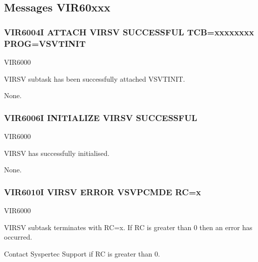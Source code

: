 \documentclass[letterpaper,10pt,english]{sphinxmanual}
\begin{document}
\subsection{Messages VIR60xxx}
\label{\detokenize{messages:messages-vir60xxx}}

\subsubsection{VIR6004I ATTACH VIRSV SUCCESSFUL TCB=xxxxxxxx PROG=VSVTINIT}
\label{\detokenize{messages:vir6004i-attach-virsv-successful-tcb-xxxxxxxx-prog-vsvtinit}}\begin{description}
\sphinxAtStartPar
VIR6000

\sphinxAtStartPar
VIRSV subtask has been successfully attached VSVTINIT.

\sphinxAtStartPar
None.

\end{description}


\subsubsection{VIR6006I INITIALIZE VIRSV SUCCESSFUL}
\label{\detokenize{messages:vir6006i-initialize-virsv-successful}}\begin{description}
\sphinxAtStartPar
VIR6000

\sphinxAtStartPar
VIRSV has successfully initialised.

\sphinxAtStartPar
None.

\end{description}


\subsubsection{VIR6010I VIRSV ERROR VSVPCMDE RC=x}
\label{\detokenize{messages:vir6010i-virsv-error-vsvpcmde-rc-x}}\begin{description}
\sphinxAtStartPar
VIR6000

\sphinxAtStartPar
VIRSV subtask terminates with RC=x. If RC is greater than 0 then an error has occurred.

\sphinxAtStartPar
Contact Syspertec Support if RC is greater than 0.

\end{description}
\end{document}

